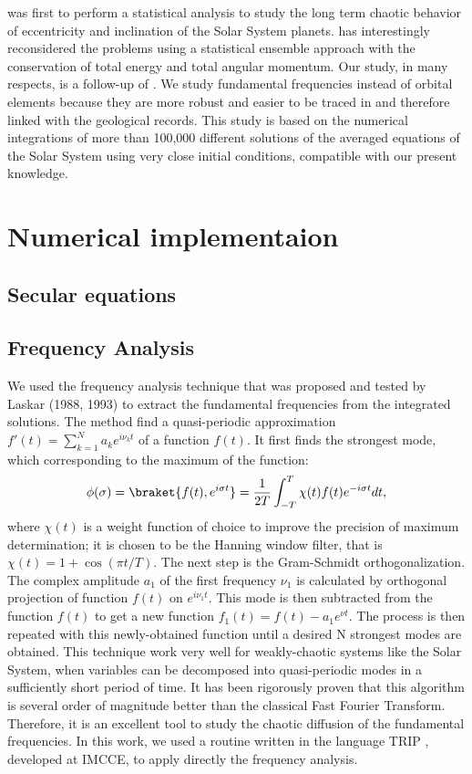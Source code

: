 \documentclass{article}
\begin{document}
 \cite{laskar2008} was first to perform a statistical analysis to study the long term chaotic behavior of eccentricity and inclination of the Solar System planets. \cite{federico2017}  has interestingly reconsidered the problems using a statistical ensemble approach with the conservation of total energy and total angular momentum. Our study, in many respects, is a follow-up of \citep{laskar2008}. We study fundamental frequencies instead of orbital elements because they are more robust and easier to be traced in and therefore linked with the geological records. This study is based on the numerical integrations of more than 100,000 different solutions of the averaged equations of the Solar System using very close initial conditions, compatible with our present knowledge. 

\section{Numerical implementaion}
\subsection{Secular equations}
\subsection{Frequency Analysis} \label{sect:FA}
We used the frequency analysis technique that was proposed and tested by Laskar (1988, 1993) to extract the fundamental frequencies from the integrated solutions. The method find a quasi-periodic approximation $f'(t) = \sum_{k=1}^N a_k e^{i\nu_k t}$ of a function $f(t)$. It first finds the strongest mode, which corresponding  to the maximum of the function: 
\begin{equation}
    \phi (\sigma) = \braket{f(t), e^{i \sigma t}} = \frac{1}{2T} \int^T_{-T} \chi( t ) f(t) e^{-i \sigma t} dt, 
\end{equation}
where $\chi (t)$ is a weight function of choice to improve the precision of maximum determination; it is chosen to be the Hanning window filter, that is $\chi(t) = 1 + \cos(\pi t/T )$. The next step is the Gram-Schmidt orthogonalization. The complex amplitude $a_1$ of the first frequency  $\nu_1$ is calculated by orthogonal projection of function $f(t)$ on  $e^{i\nu_1 t}$. This mode is then subtracted from the function $f(t)$ to get a new function $f_1(t) = f(t) - a_1 e^{\nu t}$. The process is then repeated with this newly-obtained function until a desired N strongest modes are obtained. This technique work very well for weakly-chaotic systems like the Solar System, when variables can be decomposed into quasi-periodic modes in a sufficiently short period of time. It has been rigorously proven that this algorithm is several order of magnitude better than the classical Fast Fourier Transform. Therefore, it is an excellent tool to study the chaotic diffusion of the fundamental frequencies. In this work, we used a routine written in the language TRIP \citep{gastineau2011trip}, developed at IMCCE, to apply directly the frequency analysis.
\end{document}
